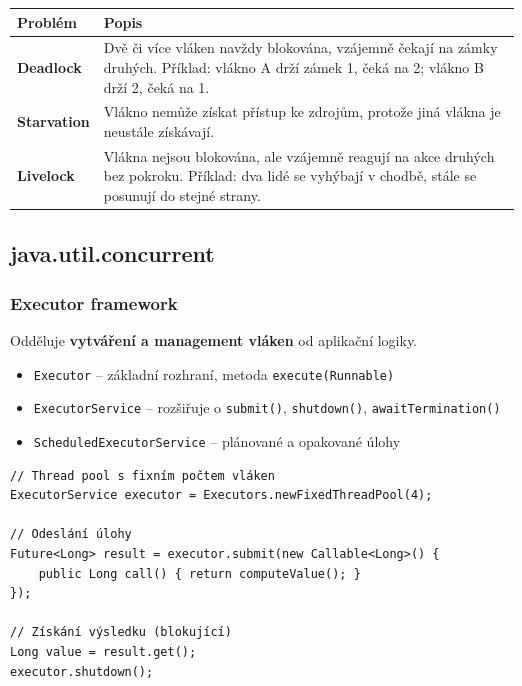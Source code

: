 \documentclass[11pt,a4paper]{article}
\begin{document}
\begin{center}
\begin{tabular}{>{\raggedright}p{2.5cm} >{\raggedright\arraybackslash}p{11cm}}
\toprule
\textbf{Problém} & \textbf{Popis} \\
\midrule
\textbf{Deadlock} & Dvě či více vláken navždy blokována, vzájemně čekají na zámky druhých. Příklad: vlákno A drží zámek 1, čeká na 2; vlákno B drží 2, čeká na 1. \\
\addlinespace
\textbf{Starvation} & Vlákno nemůže získat přístup ke zdrojům, protože jiná vlákna je neustále získávají. \\
\addlinespace
\textbf{Livelock} & Vlákna nejsou blokována, ale vzájemně reagují na akce druhých bez pokroku. Příklad: dva lidé se vyhýbají v chodbě, stále se posunují do stejné strany. \\
\bottomrule
\end{tabular}
\end{center}

\subsection{java.util.concurrent}

\subsubsection{Executor framework}

\begin{tcolorbox}[defbox,title=ExecutorService]
Odděluje \textbf{vytváření a management vláken} od aplikační logiky.
\begin{itemize}
    \item \texttt{Executor} -- základní rozhraní, metoda \texttt{execute(Runnable)}
    \item \texttt{ExecutorService} -- rozšiřuje o \texttt{submit()}, \texttt{shutdown()}, \texttt{awaitTermination()}
    \item \texttt{ScheduledExecutorService} -- plánované a opakované úlohy
\end{itemize}
\end{tcolorbox}

\begin{verbatim}
// Thread pool s fixním počtem vláken
ExecutorService executor = Executors.newFixedThreadPool(4);

// Odeslání úlohy
Future<Long> result = executor.submit(new Callable<Long>() {
    public Long call() { return computeValue(); }
});

// Získání výsledku (blokující)
Long value = result.get();
executor.shutdown();
\end{verbatim}
\end{document}
